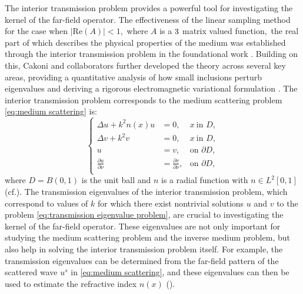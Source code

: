 \documentclass[11pt,reqno]{amsart}
\theoremstyle{definition}
\theoremstyle{remark}
\numberwithin{equation}{section}
\begin{document}
The interior transmission problem provides a powerful tool for investigating the kernel of the far-field operator. The effectiveness of the linear sampling method for the case when $|\text{Re}(A)|<1$,~where $A$ is a $3\time3$ matrix valued function,~the real part of which describes the physical properties of the medium was established through the interior transmission problem in the foundational work \cite{CH03}. Building on this, Cakoni and collaborators further developed the theory across several key areas, providing a quantitative analysis of how small inclusions perturb eigenvalues \cite{CMR15} and deriving a rigorous electromagnetic variational formulation \cite{CH07}. The interior transmission problem corresponds to the medium scattering problem \eqref{eq:medium scattering} is:
\begin{equation}\label{eq:transmission eigenvalue problem}
	\left\{
	\begin{array}{rlllr}
		\Delta  u + k^2 n(x) u & = 0, &x~ \text{in } D, \\
		\Delta  v + k^2 v & = 0, &x~ \text{in } D, \\
		u & = v, & \text{on } \partial D, \\
		\frac{\partial u}{\partial \nu} & = \frac{\partial v}{\partial \nu}, & \text{on } \partial D, \\
	\end{array}
	\right.
\end{equation}
where $D = B(0, 1)$ is the unit ball and $n$ is a radial function with $n \in L^2[0, 1]$ (cf.\cite{CCH16}). The transmission eigenvalues of the interior transmission problem, which correspond to values of $k$ for which there exist nontrivial solutions $u$ and $v$ to the problem \eqref{eq:transmission eigenvalue problem}, are crucial to investigating the kernel of the far-field operator. These eigenvalues are not only important for studying the medium scattering problem and the inverse medium problem, but also help in solving the interior transmission problem itself. For example, the transmission eigenvalues can be determined from the far-field pattern of the scattered wave $u^s$ in \eqref{eq:medium scattering}, and these eigenvalues can then be used to estimate the refractive index $n(x)$ (\cite{CCH09,CCH10,CPS07}).
\end{document}
